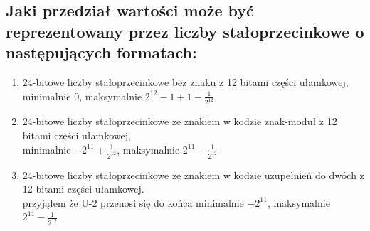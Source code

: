 \documentclass{article}
\begin{document}
\begin{enumerate}
\begin{enumerate}
	\section{Jaki przedział wartości może być reprezentowany przez liczby stałoprzecinkowe o następujących formatach:}
	\begin{enumerate}
		\item 24-bitowe liczby stałoprzecinkowe bez znaku z 12 bitami części ułamkowej,\\
		minimalnie 0, maksymalnie $2^{12}-1 + 1 - \frac{1}{2^{12}}$
		\item 24-bitowe liczby stałoprzecinkowe ze znakiem w kodzie znak-moduł z 12 bitami części ułamkowej,\\
		minimalnie $-2^{11} +  \frac{1}{2^{12}}$, maksymalnie $2^{11} - \frac{1}{2^{12}}$
		\item 24-bitowe liczby stałoprzecinkowe ze znakiem w kodzie uzupełnień do dwóch z 12 bitami części
ułamkowej.\\
przyjąłem że U-2 przenosi się do końca
minimalnie $-2^{11}$, maksymalnie $2^{11} - \frac{1}{2^{12}}$
	\end{enumerate}
	
\end{enumerate}
	
\end{enumerate}
\end{document}
